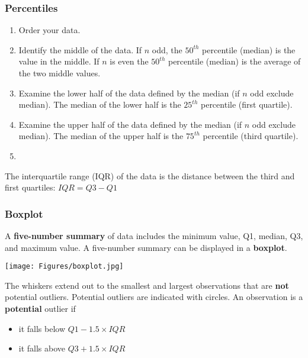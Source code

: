 \begin{frame}[label=percentiles]
\frametitle{Percentiles}
\begin{enumerate}
    \item
    Order your data.
    \item
    Identify the middle of the data.  If $n$ odd, the $50^{th}$ percentile (median) is the value in the middle.  If $n$ is even the $50^{th}$ percentile (median) is the average of the two middle values.
    \item
    Examine the lower half of the data defined by the median (if $n$ odd exclude median).  The median of the lower half is the $25^{th}$ percentile (first quartile).
    \item
    Examine the upper half of the data defined by the median (if $n$ odd exclude median).  The median of the upper half is the $75^{th}$ percentile (third quartile).
    \item[]
\end{enumerate}
The interquartile range (IQR) of the data is the distance between the third and first quartiles: $IQR = Q3 - Q1$
\begin{flushright}
\hyperlink{summarizing}{}
\end{flushright}
\end{frame}



\begin{frame}[label=boxplot]
\frametitle{Boxplot}
A \textbf{five-number summary} of data includes the minimum value, Q1, median, Q3, and maximum value.  A five-number summary can be displayed in a \textbf{boxplot}.
\begin{center}
\texttt{[image: Figures/boxplot.jpg]}
\end{center}
The whiskers extend out to the smallest and largest observations that are \textbf{not} potential outliers.  Potential outliers are indicated with circles.  An observation is a \textbf{potential} outlier if
\begin{itemize}
    \item
    it falls below $Q1-1.5\times IQR$
    \item
    it falls above  $Q3+1.5\times IQR$
\end{itemize}
\begin{flushright}
\hyperlink{summarizing}{}
\end{flushright}
\end{frame}






 